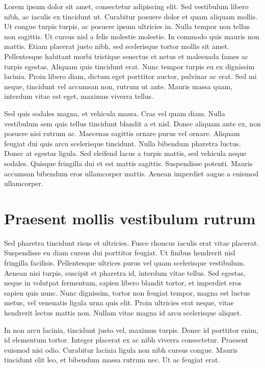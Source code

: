 Lorem ipsum dolor sit amet, consectetur adipiscing elit. Sed vestibulum libero nibh, ac iaculis ex tincidunt ut. Curabitur posuere dolor et quam aliquam mollis. Ut congue turpis turpis, ac posuere ipsum ultricies in. Nulla tempor non tellus non sagittis. Ut cursus nisl a felis molestie molestie. In commodo quis mauris non mattis. Etiam placerat justo nibh, sed scelerisque tortor mollis sit amet. Pellentesque habitant morbi tristique senectus et netus et malesuada fames ac turpis egestas. Aliquam quis tincidunt erat. Nunc tempor turpis eu ex dignissim lacinia. Proin libero diam, dictum eget porttitor auctor, pulvinar ac erat. Sed mi neque, tincidunt vel accumsan non, rutrum ut ante. Mauris massa quam, interdum vitae est eget, maximus viverra tellus.

Sed quis sodales magna, et vehicula massa. Cras vel quam diam. Nulla vestibulum sem quis tellus tincidunt blandit a et nisl. Donec aliquam ante ex, non posuere nisi rutrum ac. Maecenas sagittis ornare purus vel ornare. Aliquam feugiat dui quis arcu scelerisque tincidunt. Nulla bibendum pharetra luctus. Donec at egestas ligula. Sed eleifend lacus a turpis mattis, sed vehicula neque sodales. Quisque fringilla dui et est mattis sagittis. Suspendisse potenti. Mauris accumsan bibendum eros ullamcorper mattis. Aenean imperdiet augue a euismod ullamcorper.

\section{Praesent mollis vestibulum rutrum}
Sed pharetra tincidunt risus et ultricies. Fusce rhoncus iaculis erat vitae placerat. Suspendisse eu diam cursus dui porttitor feugiat. Ut finibus hendrerit nisl fringilla facilisis. Pellentesque ultrices purus vel quam scelerisque vestibulum. Aenean nisi turpis, suscipit et pharetra id, interdum vitae tellus. Sed egestas, neque in volutpat fermentum, sapien libero blandit tortor, et imperdiet eros sapien quis nunc. Nunc dignissim, tortor non feugiat tempor, magna est luctus metus, vel venenatis ligula urna quis elit. Proin ultricies erat neque, vitae hendrerit lectus mattis non. Nullam vitae magna id arcu scelerisque aliquet.

In non arcu lacinia, tincidunt justo vel, maximus turpis. Donec id porttitor enim, id elementum tortor. Integer placerat ex ac nibh viverra consectetur. Praesent euismod nisi odio. Curabitur lacinia ligula non nibh cursus congue. Mauris tincidunt elit leo, et bibendum massa rutrum nec. Ut ac feugiat erat.

